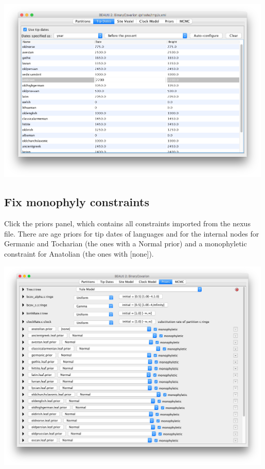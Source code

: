 \documentclass{article}
\begin{document}
\begin{center}
\includegraphics[width=0.99\textwidth]{tipdates}
\end{center}

\subsection*{Fix monophyly constraints}

Click the priors panel, which contains all constraints imported from the nexus file. There are age priors for tip dates of languages and for the internal nodes for Germanic and Tocharian (the ones with a Normal prior) and a monophyletic constraint for Anatolian (the ones with [none]).

\begin{center}
\includegraphics[width=0.99\textwidth]{priorpanel0}
\end{center}
\end{document}
